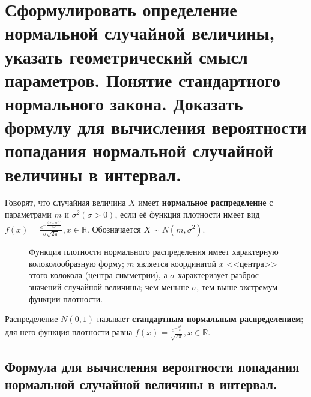 \section{Сформулировать определение нормальной случайной величины, указать геометрический смысл параметров. Понятие стандартного нормального закона. Доказать формулу для вычисления вероятности попадания нормальной случайной величины в интервал.}

Говорят, что случайная величина $X$ имеет \textbf{нормальное распределение} с параметрами $m$ и $\sigma^2 (\sigma > 0)$, если её функция плотности имеет вид $f(x) = \frac{e^{-\frac{(x-m)^2}{2\sigma^2}}}{\sigma\sqrt{2\pi}}, x \in \mathbb{R}$. Обозначается $X \sim N(m, \sigma^2)$.


\begin{figure}[ht!]
	\begin{minipage}{0.4\textwidth}
	\end{minipage}%
	\hfill
	\begin{minipage}{0.45\textwidth}
		Функция плотности нормального распределения имеет характерную колоколообразную форму; $m$ является координатой $x$ <<центра>> этого колокола (центра симметрии), а $\sigma$ характеризует разброс значений случайной величины; чем меньше $\sigma$, тем выше экстремум функции плотности.
	\end{minipage}
\end{figure}

Распределение $N(0, 1)$ называет \textbf{стандартным нормальным распределением}; для него функция плотности равна $f(x) = \frac{e^{-\frac{x^2}{2}}}{\sqrt{2\pi}}, x \in \mathbb{R}$.

\subsection*{Формула для вычисления вероятности попадания нормальной случайной величины в интервал.}

